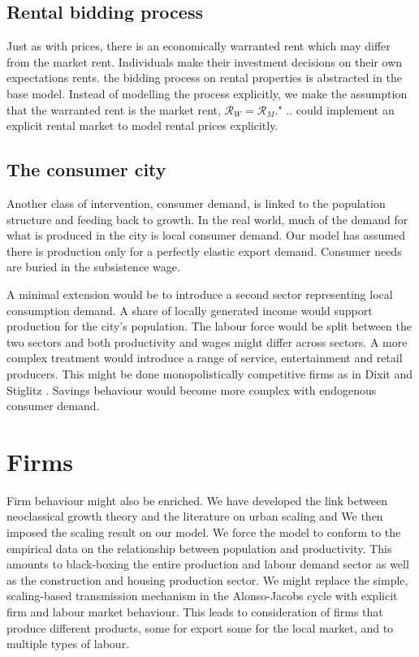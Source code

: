 \subsection{Rental bidding process}
Just as with prices, there is an economically \gls{warranted rent} which may differ from the \gls{market rent}. Individuals make their investment decisions on their own expectations rents. the bidding process on rental properties is abstracted in the base model. Instead of modelling the process explicitly, we make the assumption that the warranted rent is the market rent, $\mathcal{R}_W = \mathcal{R}_M$." .. could implement an explicit rental market to model rental prices explicitly.


\subsection{The consumer city}

Another class of intervention, consumer demand, is linked to the population structure and feeding back to growth. In the real world, much of the demand for what is produced in the city is local consumer demand.  Our model has assumed there is production only for a perfectly elastic export demand. Consumer needs are buried in the subsistence wage. 

A minimal extension would be to introduce a second sector representing local consumption demand. A share of locally generated income would support production for the city's population. The labour force would be split between the two sectors and both productivity and wages might differ across sectors. A more complex treatment would introduce a range of service, entertainment and retail producers. This might be done monopolistically competitive firms as in Dixit and Stiglitz \cite{AvinashK.Dixit1977MCaO}. Savings behaviour would become more complex with endogenous consumer demand. %


\section{Firms}

Firm behaviour might also be enriched. We have  developed the link between neoclassical growth theory and the literature on urban scaling \cite{bettencourtIntroductionUrbanScience2021} and  We then imposed the scaling result on our model.  We force the model to conform to the empirical data on the relationship between population and productivity. This amounts to black-boxing the entire production and labour demand sector as well as the construction and housing production sector. 
We might replace the simple, scaling-based transmission mechanism in the Alonso-Jacobs cycle with explicit firm and labour market behaviour. %
This leads to consideration of firms that produce different products, some for export some for the local market, and to multiple types of labour.

